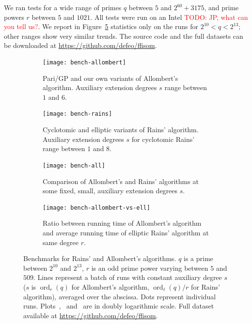 \documentclass[12pt]{article}
\theoremstyle{plain}
\theoremstyle{definition}
\newcommand{\todo}[1]{\textcolor{red}{TODO: #1}}
\DeclareMathOperator{\order}{ord} %
\newcounter{algorithm}
\begin{document}
We ran tests for a wide range of primes $q$ between $5$ and
$2^{60}+3175$, and prime powers $r$ between $5$ and $1021$. All tests
were run on an Intel \todo{JP, what can you tell us?}. We report in
Figure~\ref{fig:bench} statistics only on the runs for
$2^{10}<q<2^{13}$; other ranges show very similar trends. The source
code and the full datasets can be downloaded at
\url{https://github.com/defeo/ffisom}.



\begin{figure}
  \newlength{\mywidth}
  \setlength{\mywidth}{8cm}
  \centering

  \begin{subfigure}{.48\textwidth}
    \texttt{[image: bench-allombert]}
    \caption{Pari/GP and our own variants of Allombert's algorithm.
      Auxiliary extension degrees $s$ range between $1$ and $6$.}
    \label{fig:bench:allombert}
  \end{subfigure}
  \hfill
  \begin{subfigure}{.48\textwidth}
    \noindent
    \texttt{[image: bench-rains]}
    \caption{Cyclotomic and elliptic variants of Rains' algorithm.
      Auxiliary extension degrees $s$ for cyclotomic Rains' range
      between $1$ and $8$.}
    \label{fig:bench:rains}
  \end{subfigure}
  
  \begin{subfigure}{.48\textwidth}
    \noindent
    \texttt{[image: bench-all]}
    \caption{Comparison of Allombert's and Rains' algorithms at some
      fixed, small, auxiliary extension degrees $s$.}
    \label{fig:bench:all}
  \end{subfigure}
  \hfill
  \begin{subfigure}{.48\textwidth}
    \noindent
    \texttt{[image: bench-allombert-vs-ell]}
    \caption{Ratio between running time of Allombert's algorithm and
      average running time of elliptic Rains' algorithm at same degree
      $r$.}
    \label{fig:bench:allombert-vs-ell}
  \end{subfigure}

  \caption{Benchmarks for Rains' and Allombert's algorithms. $q$ is a
    prime between $2^{10}$ and $2^{13}$, $r$ is an odd prime power varying
    between $5$ and $509$.  Lines represent a batch of runs with
    constant auxiliary degree $s$ ($s$ is $\order_r(q)$ for
    Allombert's algorithm, $\order_\ell(q)/r$ for Rains' algorithm),
    averaged over the abscissa. Dots represent individual runs.
    Plots~,~
    and~ are in doubly logarithmic scale. Full
    dataset available at \url{https://github.com/defeo/ffisom}.}
  \label{fig:bench}
\end{figure}
\end{document}
